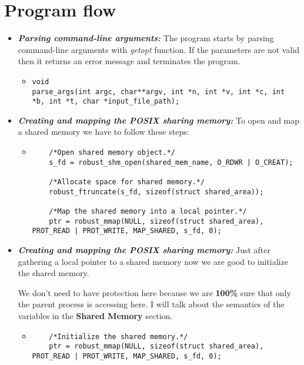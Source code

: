 \documentclass{article}
\begin{document}
\section{Program flow}
\begin{itemize}

\item \textbf{\textit{Parsing command-line arguments:}} The program starts by parsing command-line arguments with \textit{getopt} function. If the parameters are not valid then it returns an error message and terminates the program.

\begin{itemize}
    \item 
    \begin{lstlisting}
void 
parse_args(int argc, char**argv, int *n, int *v, int *c, int *b, int *t, char *input_file_path);
    \end{lstlisting}
\end{itemize}



\item \textbf{\textit{Creating and mapping the POSIX sharing memory:}} To open and map a shared memory we have to follow these steps:
\begin{itemize}
  \item 
    \begin{lstlisting}
    /*Open shared memory object.*/
    s_fd = robust_shm_open(shared_mem_name, O_RDWR | O_CREAT); 
    
    /*Allocate space for shared memory.*/
    robust_ftruncate(s_fd, sizeof(struct shared_area));
    
    /*Map the shared memory into a local pointer.*/
    ptr = robust_mmap(NULL, sizeof(struct shared_area), PROT_READ | PROT_WRITE, MAP_SHARED, s_fd, 0);
    \end{lstlisting}
\end{itemize}
\newpage
\item \textbf{\textit{Creating and mapping the POSIX sharing memory:}} Just after gathering a local pointer to a shared memory now we are good to initialize the shared memory. 

\quad We don't need to have protection here because we are \textbf{100\%} sure that only the parent process is accessing here. I will talk about the semantics of the variables in the \textbf{Shared Memory} section.   
\begin{itemize}
  \item 
    \begin{lstlisting}
    /*Initialize the shared memory.*/
    ptr = robust_mmap(NULL, sizeof(struct shared_area), PROT_READ | PROT_WRITE, MAP_SHARED, s_fd, 0);


\end{lstlisting}
\end{itemize}
\end{itemize}
\end{document}
